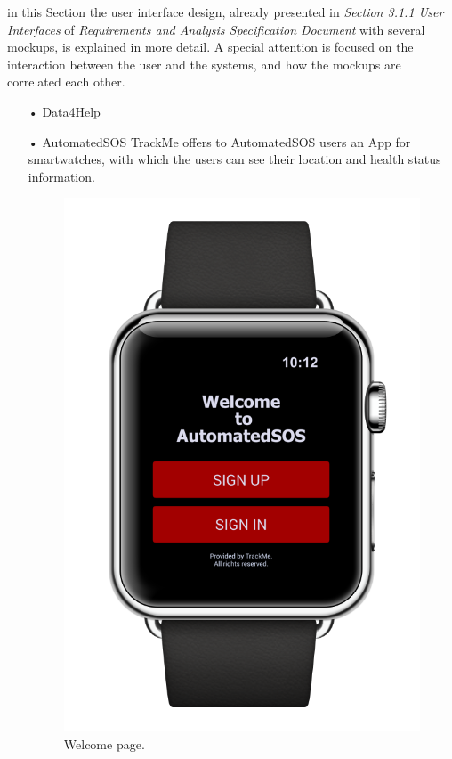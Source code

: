 \noindent
in this Section the user interface design, already presented in  \textit{Section 3.1.1 User Interfaces} of \textit{Requirements and Analysis Specification Document} with several mockups, is explained in more detail. A special attention is focused on the interaction between the user and the systems, and how the mockups are correlated each other.
\bigbreak
\noindent
\begin{enumerate}
\item[•]{\Large Data4Help}
\newpage
\item[•]{\Large AutomatedSOS}
\bigbreak
\noindent
TrackMe offers to AutomatedSOS users an App for smartwatches, with which the users can see their location and health status information.
\begin{figure}[H]
\begin{center}
        \begin{minipage}[c]{.40\textwidth}
        \centering
          \includegraphics[height=12 cm]{Images/Mockups/AutomatedSOSMockup1.png}
          	\caption{Welcome page.}
        \end{minipage}%
        \hspace{10mm}%
        \begin{minipage}[c]{.40\textwidth}
        \centering

\end{minipage}
\end{center}
\end{figure}
\end{enumerate}
